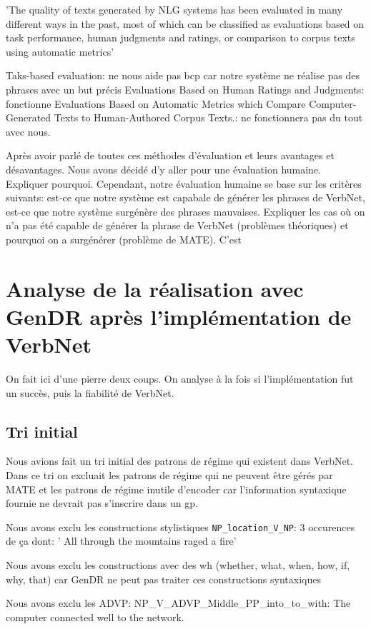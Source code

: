 'The quality of texts generated by NLG systems has been evaluated in many different ways in the past, most of which can be classified as evaluations based on task performance, human judgments and ratings, or comparison to corpus texts using automatic metrics'

Taks-based evaluation:  ne nous aide pas bcp car notre système ne réalise pas des phrases avec un but précis
Evaluations Based on Human Ratings and Judgments: fonctionne
Evaluations Based on Automatic Metrics which Compare Computer-Generated Texts
to Human-Authored Corpus Texts.: ne fonctionnera pas du tout avec nous.

Après avoir parlé de toutes ces méthodes d'évaluation et leurs avantages et désavantages. Nous avons décidé d'y aller pour une évaluation humaine. Expliquer pourquoi. Cependant, notre évaluation humaine se base sur les critères suivants: est-ce que notre système est capabale de générer les phrases de VerbNet, est-ce que notre système surgénère des phrases mauvaises. Expliquer les cas où on n'a pas été capable de générer la phrase de VerbNet (problèmes théoriques) et pourquoi on a surgénérer (problème de MATE). C'est 

\section{Analyse de la réalisation avec GenDR après l'implémentation de VerbNet}

On fait ici d'une pierre deux coups. On analyse à la fois si l'implémentation fut un succès, puis la fiabilité de VerbNet.

\subsection{Tri initial}
Nous avions fait un tri initial des patrons de régime qui existent dans VerbNet. Dans ce tri on excluait les patrons de régime qui ne peuvent être gérés par MATE et les patrons de régime inutile d'encoder car l'information syntaxique fournie ne devrait pas s'inscrire dans un gp.

Nous avons exclu les constructions stylistiques
\lstinline!NP_location_V_NP!: 3 occurences de ça dont: ' All through the mountains raged a fire'

Nous avons exclu les constructions avec des wh (whether, what, when, how, if, why, that) car GenDR ne peut pas traiter ces constructions syntaxiques

Nous avons exclu les ADVP: NP\_V\_ADVP\_Middle\_PP\_into\_to\_with: The computer connected well to the network.

